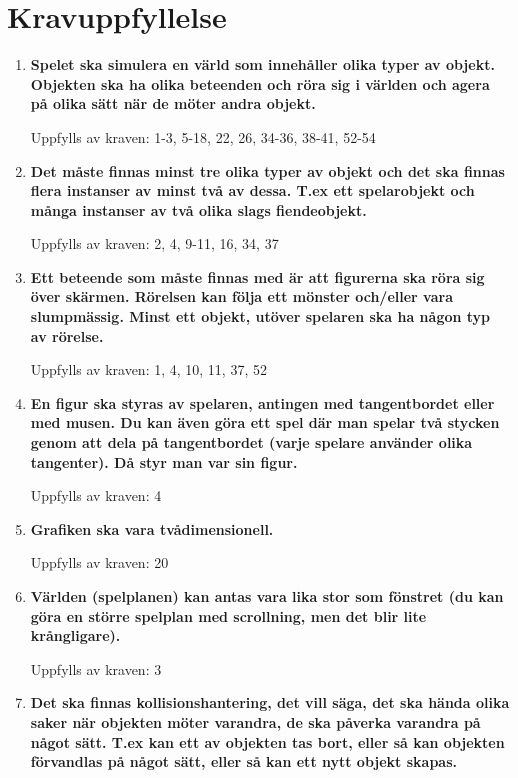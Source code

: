\documentclass{TDP005mall}
\begin{document}
\section{Kravuppfyllelse}

\begin{enumerate}
    \item \textbf{Spelet ska simulera en värld som innehåller olika typer av objekt. Objekten ska ha olika beteenden och röra sig i världen och agera på olika sätt när de möter andra objekt.}
    
    Uppfylls av kraven: 1-3, 5-18, 22, 26, 34-36, 38-41, 52-54
    
    \item \textbf{Det måste finnas minst tre olika typer av objekt och det ska finnas flera instanser av minst två av dessa. T.ex ett spelarobjekt och många instanser av två olika slags fiendeobjekt.}
    
    Uppfylls av kraven: 2, 4, 9-11, 16, 34, 37
    
    \item \textbf{Ett beteende som måste finnas med är att figurerna ska röra sig över skärmen. Rörelsen kan följa ett mönster och/eller vara slumpmässig. Minst ett objekt, utöver spelaren ska ha någon typ av rörelse.}
    
    Uppfylls av kraven: 1, 4, 10, 11, 37, 52
    
    \item \textbf{En figur ska styras av spelaren, antingen med tangentbordet eller med musen. Du kan även göra ett spel där man spelar två stycken genom att dela på tangentbordet (varje spelare använder olika tangenter). Då styr man var sin figur.}
    
    Uppfylls av kraven: 4
    
    \item \textbf{Grafiken ska vara tvådimensionell.}
    
    Uppfylls av kraven: 20
    
    \item \textbf{Världen (spelplanen) kan antas vara lika stor som fönstret (du kan göra en större spelplan med scrollning, men det blir lite krångligare).}
    
    Uppfylls av kraven: 3
    
    \item \textbf{Det ska finnas kollisionshantering, det vill säga, det ska hända olika saker när objekten möter varandra, de ska påverka varandra på något sätt. T.ex kan ett av objekten tas bort, eller så kan objekten förvandlas på något sätt, eller så kan ett nytt objekt skapas.}
    

\end{enumerate}
\end{document}
